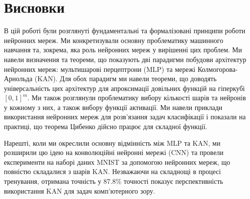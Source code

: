 \chapter*{Висновки}

\hspace{\parindent} В цій роботі були розглянуті фундаментальні та формалізовані
принципи роботи нейронних мереж. Ми конкретизували основну проблематику 
машинного навчання та, зокрема, яка роль нейронних мереж у вирішенні цих
проблем. Ми навели визначення та теореми, що показують дві парадигми 
побудови архітектур нейронних мереж: мультишарові перцептрони (MLP) та 
мережі Колмогорова-Арнольда (KAN). Для обох парадигм ми навели теореми,
що доводять універсальність цих архітектур для апроксимації довільних 
функцій на гіперкубі $[0, 1]^m$. Ми також розглянули проблематику
вибору кількості шарів та нейронів у кожному з них, а також вибору
функції активації. Ми навели приклади використання нейронних мереж для
розв'язання задач класифікації і показали на практиці, що теорема 
Цибенко дійсно працює для складної функції. 

Нарешті, коли ми окреслили основну відмінність між MLP та KAN, ми розширили цю
ідею на конволюційні нейронні мережі (CNN) та провели експерименти на наборі
даних MNIST за допомогою нейронних мереж, що повністю складалися з шарів KAN.
Незважаючи на складнощі в процесі тренування, отримана точність у 87.8\%
точності показує перспективність використання KAN для задач комп'ютерного зору.